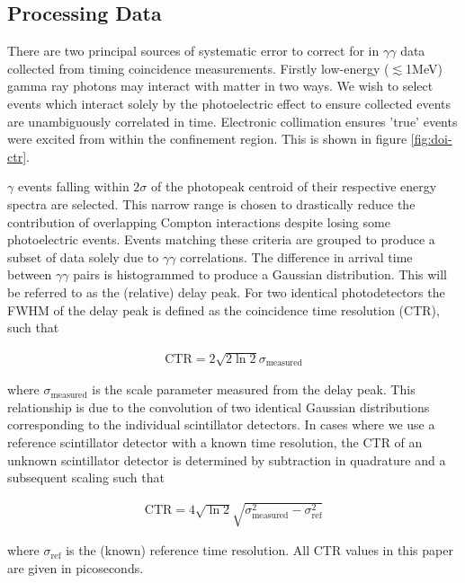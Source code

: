 \subsection{Processing Data}
There are two principal sources of systematic error to correct for in $\gamma\gamma$ data collected from timing coincidence measurements. Firstly low-energy ($\lesssim$1MeV) gamma ray photons may interact with matter in two ways. We wish to select events which interact solely by the photoelectric effect to ensure collected events are unambiguously correlated in time. Electronic collimation ensures 'true' events were excited from within the confinement region. This is shown in figure \ref{fig:doi-ctr}.

$\gamma$ events falling within $2\sigma$ of the photopeak centroid of their respective energy spectra are selected. This narrow range is chosen to drastically reduce the contribution of overlapping Compton interactions despite losing some photoelectric events. Events matching these criteria are grouped to produce a subset of data solely due to $\gamma\gamma$ correlations. The difference in arrival time between $\gamma\gamma$ pairs is histogrammed to produce a Gaussian distribution. This will be referred to as the (relative) delay peak. For two identical photodetectors the FWHM of the delay peak is defined as the coincidence time resolution (CTR), such that

\begin{align}
\text{CTR} = 2\sqrt{2\ln{2}}\sigma_\textrm{measured}
\label{eqn:trtoctr}
\end{align}

where $\sigma_\textrm{measured}$ is the scale parameter measured from the delay peak. This relationship is due to the convolution of two identical Gaussian distributions corresponding to the individual scintillator detectors. In cases where we use a reference scintillator detector with a known time resolution, the CTR of an unknown scintillator detector is determined by subtraction in quadrature and a subsequent scaling such that

\begin{align}
\text{CTR} = 4\sqrt{\ln{2}}\sqrt{\sigma_\textrm{measured}^2-\sigma_\textrm{ref}^2}
\end{align}

where $\sigma_\text{ref}$ is the (known) reference time resolution. All CTR values in this paper are given in picoseconds.

